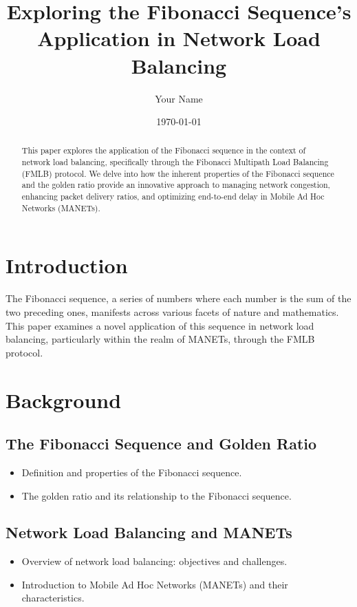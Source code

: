 \documentclass[12pt]{article}
\title{Exploring the Fibonacci Sequence's Application in Network Load Balancing}
\author{Your Name}
\date{\today}
\begin{document}
\maketitle

\begin{abstract}
This paper explores the application of the Fibonacci sequence in the context of network load balancing, specifically through the Fibonacci Multipath Load Balancing (FMLB) protocol. We delve into how the inherent properties of the Fibonacci sequence and the golden ratio provide an innovative approach to managing network congestion, enhancing packet delivery ratios, and optimizing end-to-end delay in Mobile Ad Hoc Networks (MANETs).
\end{abstract}

\section{Introduction}
The Fibonacci sequence, a series of numbers where each number is the sum of the two preceding ones, manifests across various facets of nature and mathematics. This paper examines a novel application of this sequence in network load balancing, particularly within the realm of MANETs, through the FMLB protocol.

\section{Background}
\subsection{The Fibonacci Sequence and Golden Ratio}
\begin{itemize}
    \item Definition and properties of the Fibonacci sequence.
    \item The golden ratio and its relationship to the Fibonacci sequence.
\end{itemize}

\subsection{Network Load Balancing and MANETs}
\begin{itemize}
    \item Overview of network load balancing: objectives and challenges.
    \item Introduction to Mobile Ad Hoc Networks (MANETs) and their characteristics.
\end{itemize}
\end{document}
